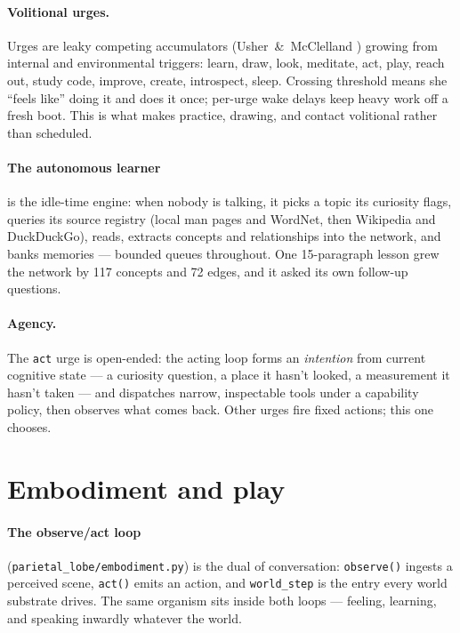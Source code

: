 \documentclass[11pt]{article}
\newcommand{\code}[1]{\texttt{\small #1}}
\begin{document}
\paragraph{Volitional urges.} Urges are leaky competing accumulators
(Usher~\&~McClelland \cite{usher}) growing from internal and environmental triggers:
learn, draw, look, meditate, act, play, reach out, study code, improve,
create, introspect, sleep. Crossing threshold means she ``feels like''
doing it and does it once; per-urge wake delays keep heavy work off a
fresh boot. This is what makes practice, drawing, and contact
volitional rather than scheduled.

\paragraph{The autonomous learner} is the idle-time engine: when nobody
is talking, it picks a topic its curiosity flags, queries its source
registry (local man pages and WordNet, then Wikipedia and DuckDuckGo),
reads, extracts concepts and relationships into the network, and banks
memories --- bounded queues throughout. One 15-paragraph lesson grew
the network by 117 concepts and 72 edges, and it asked its own
follow-up questions.

\paragraph{Agency.} The \code{act} urge is open-ended: the acting loop
forms an \emph{intention} from current cognitive state --- a curiosity
question, a place it hasn't looked, a measurement it hasn't taken ---
and dispatches narrow, inspectable tools under a capability policy,
then observes what comes back. Other urges fire fixed actions; this
one chooses.

\section{Embodiment and play}

\paragraph{The observe/act loop} (\code{parietal\_lobe/embodiment.py})
is the dual of conversation: \code{observe()} ingests a perceived
scene, \code{act()} emits an action, and \code{world\_step} is the
entry every world substrate drives. The same organism sits inside both
loops --- feeling, learning, and speaking inwardly whatever the world.
\end{document}
